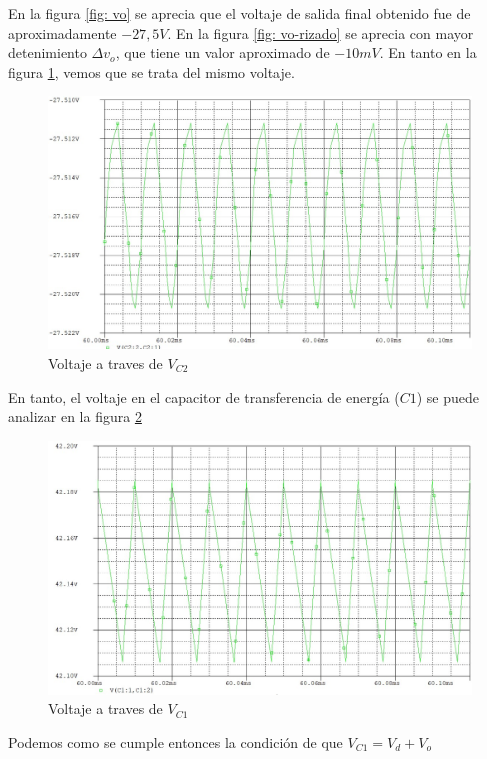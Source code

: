 \documentclass[conference]{IEEEtran}
\begin{document}
En la figura \ref{fig: vo} se aprecia que el voltaje de salida final obtenido fue de aproximadamente $-27,5V$. En la figura \ref{fig: vo-rizado} se aprecia con mayor detenimiento $\Delta v_o$, que tiene un valor aproximado de $-10mV$. En tanto en la figura \ref{fig: vc2}, vemos que se trata del mismo voltaje.

\begin{figure}[h!]
    \centering
    \includegraphics[scale=0.29]{imagenes/vc2.jpg}
    \caption{Voltaje a traves de $V_{C2}$}
    \label{fig: vc2}
\end{figure}

En tanto, el voltaje en el capacitor de transferencia de energía ($C1$) se puede analizar en la figura \ref{fig: vc1}

\begin{figure}[h!]
    \centering
    \includegraphics[scale=0.29]{imagenes/vc1.jpg}
    \caption{Voltaje a traves de $V_{C1}$}
    \label{fig: vc1}
\end{figure}

Podemos como se cumple entonces la condición de que $V_{C1}=V_d+V_o$
\end{document}
